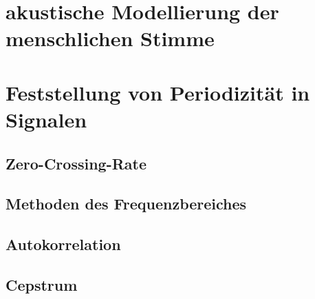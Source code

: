 \section{akustische Modellierung der menschlichen Stimme}
\section{Feststellung von Periodizität in Signalen}
\subsection{Zero-Crossing-Rate}
\subsection{Methoden des Frequenzbereiches}
\subsection{Autokorrelation}
\subsection{Cepstrum}